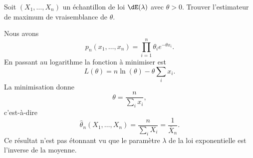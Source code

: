 \begin{example}
    
    Soit \( (X_1,\ldots,X_n)\) un échantillon de loi \( \dE(\lambda)\) avec \( \theta>0\). Trouver l'estimateur de maximum de vraisemblance de \( \theta\).

    Nous avons
    \begin{equation}
        p_n(x_1,\ldots,x_n)=\prod_{i=1}^n\theta_i e^{-\theta x_i}.
    \end{equation}
    En passant au logarithme la fonction à minimiser est
    \begin{equation}
        L(\theta)=n\ln(\theta)-\theta\sum_i x_i.
    \end{equation}
    La minimisation donne
    \begin{equation}
        \theta=\frac{ n }{ \sum_ix_i },
    \end{equation}
    c'est-à-dire
    \begin{equation}
        \hat\theta_n(X_1,\ldots,X_n)=\frac{ n }{ \sum_iX_i }=\frac{1}{ \bar X_n }.
    \end{equation}
    Ce résultat n'est pas étonnant vu que le paramètre \( \lambda\) de la loi exponentielle est l'inverse de la moyenne.

\end{example}

